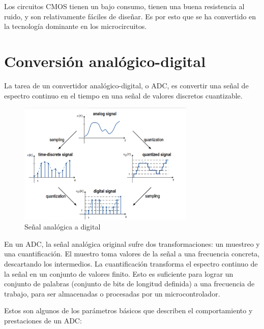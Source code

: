 \documentclass[12pt]{report} %
\begin{document}
	
	Los circuitos CMOS tienen un bajo consumo, tienen una buena resistencia al ruido, y son relativamente fáciles de diseñar. Es por esto que se ha convertido en la tecnología dominante en los microcircuitos.
	
	\section{Conversión analógico-digital}
	
	La tarea de un convertidor analógico-digital, o ADC, es convertir una señal de espectro continuo en el tiempo en una señal de valores discretos cuantizable.
	
	\begin{figure}[H]
		\includegraphics[width=0.75\textwidth]{analog-vs-digital-signal.jpg}
		\caption[Señal analógica a digital]{Señal analógica a digital\protect\footnotemark}
		\label{fig:analog-vs-digital-signal.jpg}
	\end{figure}
	
	En un ADC, la señal analógica original sufre dos transformaciones: un muestreo y una cuantificación. El muestro toma valores de la señal a una frecuencia concreta, descartando los intermedios. La cuantificación transforma el espectro continuo de la señal en un conjunto de valores finito. Esto es suficiente para lograr un conjunto de palabras (conjunto de bits de longitud definida) a una frecuencia de trabajo, para ser almacenadas o procesadas por un microcontrolador.
	
	Estos son algunos de los parámetros básicos que describen el comportamiento y prestaciones de un ADC:
	
\end{document}
